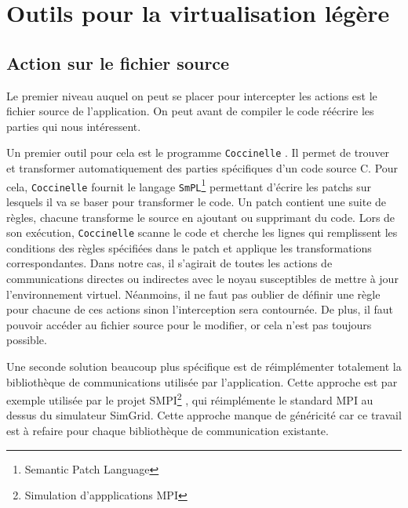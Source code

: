 \section{Outils pour la virtualisation légère}
\subsection{Action sur le fichier source}
\label{section:source}
Le premier niveau auquel on peut se placer pour intercepter les actions est le fichier source de l'application. On peut avant de compiler le code réécrire les parties qui nous intéressent.

Un premier outil pour cela est le programme \texttt{Coccinelle} \citep{cocci}. Il permet de trouver et transformer automatiquement des parties spécifiques d'un code source C. Pour cela, \texttt{Coccinelle} fournit le langage \texttt{SmPL}\footnote{Semantic Patch Language} permettant d'écrire les patchs sur lesquels il va se baser pour transformer le code. Un patch contient une suite de règles, chacune transforme le source en ajoutant ou supprimant du code. Lors de son exécution, \texttt{Coccinelle} scanne le code et cherche les lignes qui remplissent les conditions des règles spécifiées dans le patch et applique les transformations correspondantes. Dans notre cas, il s'agirait de toutes les actions de communications directes ou indirectes avec le noyau susceptibles de mettre à jour l'environnement virtuel. Néanmoins, il ne faut pas oublier de définir une règle pour chacune de ces actions sinon l'interception sera contournée. De plus, il faut pouvoir accéder au fichier source pour le modifier, or cela n'est pas toujours possible.

Une seconde solution beaucoup plus spécifique est de réimplémenter totalement la bibliothèque de communications utilisée par l'application. Cette approche est par exemple utilisée par le projet SMPI\footnote{Simulation d'appplications MPI} \citep{SMPI, clauss2011single}, qui réimplémente le standard MPI au dessus du simulateur SimGrid. Cette approche manque de  généricité car ce travail est à refaire pour chaque bibliothèque de communication existante. 

